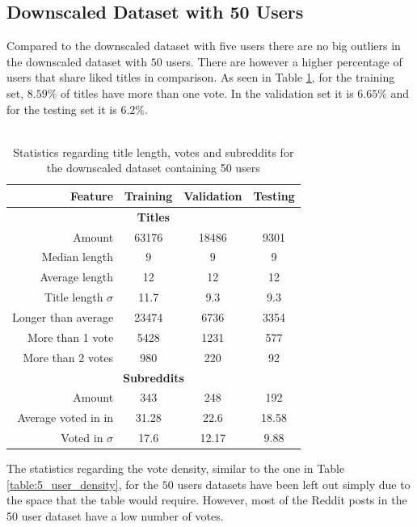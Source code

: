 \subsection{Downscaled Dataset with 50 Users}
Compared to the downscaled dataset with five users there are no big outliers in the downscaled dataset with $50$ users. There are however a higher percentage of users that share liked titles in comparison. As seen in Table \ref{table:50_user_stats}, for the training set, $8.59\%$ of titles have more than one vote. In the validation set it is $6.65\%$ and for the testing set it is $6.2\%$.
\\\\
\begin{table}[h!]
    \centering
    \begin{tabular}{ r | c | c | c }
    \textbf{Feature} & \textbf{Training} & \textbf{Validation} & \textbf{Testing} \\ \hline \hline
    \multicolumn{4}{c}{\textbf{Titles}} \\ \hline \hline
    Amount & 63176 & 18486 & 9301 \\ \hline
    Median length & 9 & 9 & 9 \\ \hline
    Average length & 12 & 12 & 12  \\ \hline
    Title length $\sigma$ & 11.7 & 9.3 & 9.3 \\ \hline
    Longer than average & 23474 & 6736 & 3354 \\ \hline
    More than 1 vote & 5428 & 1231 & 577 \\ \hline
    More than 2 votes & 980 & 220 & 92\\ \hline \hline
    \multicolumn{4}{c}{\textbf{Subreddits}} \\ \hline \hline
    Amount & 343 & 248 & 192  \\ \hline
    Average voted in in & 31.28 & 22.6 & 18.58 \\ \hline
    Voted in $\sigma$ & 17.6 & 12.17 & 9.88  \\ \hline
    \end{tabular}
    \caption{Statistics regarding title length, votes and subreddits for the downscaled dataset containing 50 users}
    \label{table:50_user_stats}
\end{table}
The statistics regarding the vote density, similar to the one in Table \ref{table:5_user_density}, for the $50$ users datasets have been left out simply due to the space that the table would require. However, most of the Reddit posts in the 50 user dataset have a low number of votes.
